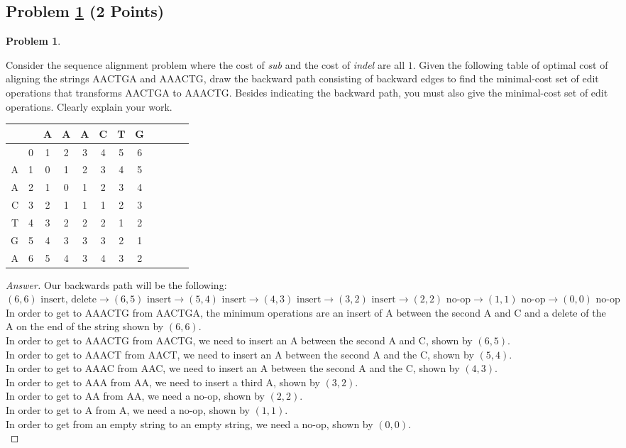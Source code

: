 \documentclass[11pt]{article}
\theoremstyle{definition}
\theoremstyle{definition}
\newtheorem{required}{Problem}
\theoremstyle{definition}
\begin{document}
\subsection{Problem \ref{DP2} (2 Points)}
\begin{required} \label{DP2}

Consider the sequence alignment problem where the cost of {\em sub} and the cost of {\em indel} are all $1$. Given the following table of optimal cost of aligning the strings AACTGA and AAACTG, draw the backward path consisting of backward edges to find the minimal-cost set of edit operations that transforms AACTGA to AAACTG. Besides indicating the backward path, you must also give the minimal-cost set of edit operations.  Clearly explain your work.

\begin{tabular}{|r|c|c|c|c|c|c|c|c|c|c|c|}
\hline
  &   & A & A & A & C & T & G \\ \hline
  & 0 & 1 & 2 & 3 & 4 & 5 & 6 \\ \hline
A & 1 & 0 & 1 & 2 & 3 & 4 & 5 \\ \hline
A & 2 & 1 & 0 & 1 & 2 & 3 & 4 \\ \hline
C & 3 & 2 & 1 & 1 & 1 & 2 & 3 \\ \hline
T & 4 & 3 & 2 & 2 & 2 & 1 & 2 \\ \hline
G & 5 & 4 & 3 & 3 & 3 & 2 & 1 \\ \hline
A & 6 & 5 & 4 & 3 & 4 & 3 & 2 \\ \hline
\end{tabular}
\end{required}

\begin{proof}[Answer]
Our backwards path will be the following:\\

$(6,6) \text{ insert, delete} \to (6,5) \text{ insert} \to (5,4) \text{ insert} \to (4,3) \text{ insert} \to (3,2) \text{ insert} \to (2,2) \text{ no-op} \to (1,1) \text{ no-op} \to (0,0) \text{ no-op}$\\

\noindent In order to get to AAACTG from AACTGA, the minimum operations are an insert of A between the second A and C and a delete of the A on the end of the string shown by $(6,6)$.\\
In order to get to AAACTG from AACTG, we need to insert an A between the second A and C, shown by $(6,5)$.\\
In order to get to AAACT from AACT, we need to insert an A between the second A and the C, shown by $(5,4)$.\\
In order to get to AAAC from AAC, we need to insert an A between the second A and the C, shown by $(4,3)$.\\
In order to get to AAA from AA, we need to insert a third A, shown by $(3,2)$.\\
In order to get to AA from AA, we need a no-op, shown by $(2,2)$.\\
In order to get to A from A, we need a no-op, shown by $(1,1)$.\\
In order to get from an empty string to an empty string, we need a no-op, shown by $(0,0)$.\\

\end{proof}
\end{document}
